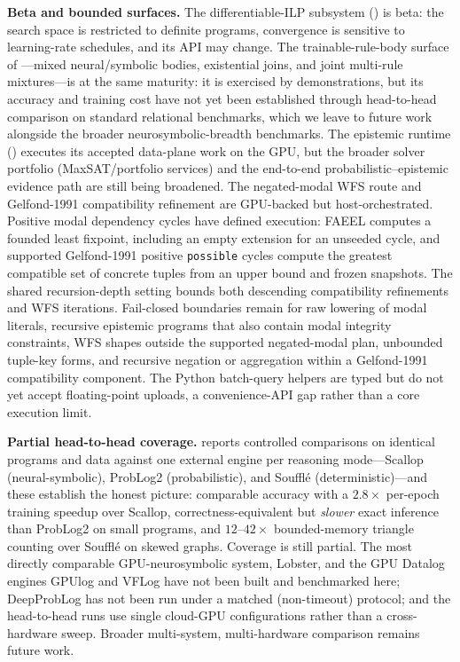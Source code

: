 \textbf{Beta and bounded surfaces.} The differentiable-ILP subsystem () is beta: the search space is restricted to definite programs, convergence is sensitive to learning-rate schedules, and its API may change. The trainable-rule-body surface of ---mixed neural/symbolic bodies, existential joins, and joint multi-rule mixtures---is at the same maturity: it is exercised by demonstrations, but its accuracy and training cost have not yet been established through head-to-head comparison on standard relational benchmarks, which we leave to future work alongside the broader neurosymbolic-breadth benchmarks. The epistemic runtime () executes its accepted data-plane work on the GPU, but the broader solver portfolio (MaxSAT/portfolio services) and the end-to-end probabilistic--epistemic evidence path are still being broadened. The negated-modal WFS route and Gelfond-1991 compatibility refinement are GPU-backed but host-orchestrated. Positive modal dependency cycles have defined execution: FAEEL computes a founded least fixpoint, including an empty extension for an unseeded cycle, and supported Gelfond-1991 positive \texttt{possible} cycles compute the greatest compatible set of concrete tuples from an upper bound and frozen snapshots. The shared recursion-depth setting bounds both descending compatibility refinements and WFS iterations. Fail-closed boundaries remain for raw lowering of modal literals, recursive epistemic programs that also contain modal integrity constraints, WFS shapes outside the supported negated-modal plan, unbounded tuple-key forms, and recursive negation or aggregation within a Gelfond-1991 compatibility component. The Python batch-query helpers are typed but do not yet accept floating-point uploads, a convenience-API gap rather than a core execution limit.

\textbf{Partial head-to-head coverage.}  reports controlled comparisons on identical programs and data against one external engine per reasoning mode---Scallop (neural-symbolic), ProbLog2 (probabilistic), and Soufflé (deterministic)---and these establish the honest picture: comparable accuracy with a $2.8\times$ per-epoch training speedup over Scallop, correctness-equivalent but \emph{slower} exact inference than ProbLog2 on small programs, and $12$--$42\times$ bounded-memory triangle counting over Soufflé on skewed graphs. Coverage is still partial. The most directly comparable GPU-neurosymbolic system, Lobster, and the GPU Datalog engines GPUlog and VFLog have not been built and benchmarked here; DeepProbLog has not been run under a matched (non-timeout) protocol; and the head-to-head runs use single cloud-GPU configurations rather than a cross-hardware sweep. Broader multi-system, multi-hardware comparison remains future work.

